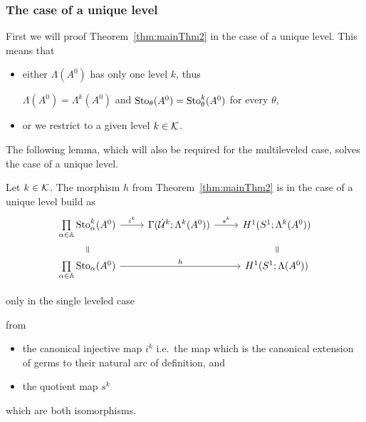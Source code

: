 \subsubsection{The case of a unique level}
First we will proof Theorem~\ref{thm:mainThm2} in the case of a unique level.
This means that
\begin{itemize}
  \item either $\Lambda(A^0)$ has only one level $k$, thus
    \begin{einr}
      $\Lambda(A^0)=\Lambda^k(A^0)$ and $\operatorname{Sto}_\theta(A^0)=\operatorname{Sto}_\theta^k(A^0)$
      for every $\theta$,
    \end{einr}
  \item or we restrict to a given level $k\in\mathcal{K}$.
\end{itemize}
The following lemma, which will also be required for the multileveled case,
solves the case of a unique level.
\begin{lem}\label{lem:solutionOfSingleLeveledCase}
  Let $k\in\mathcal{K}$.
  The morphism $h$ from Theorem~\ref{thm:mainThm2} is in the case of a unique
  level build as
  \[ \begin{tikzcd}[row sep=0cm]
    \underset{\alpha\in\A}\prod\Sto_\alpha^k(A^0)
    \rar{i^k}
    & \Gamma(\dot\cU^k;\Lambda^k(A^0))
    \rar{s^k}
    & H^1(S^1;\Lambda^k(A^0))
    \\
    \text{\rotatebox[origin=c]{-90}{$=$}}
    \tikzmark{e1}
    &&
    \tikzmark{e2}
    \text{\rotatebox[origin=c]{-90}{$=$}}
    \\
    \underset{\alpha\in\A}\prod\Sto_\alpha(A^0)
    \arrow{rr}{h}
    && H^1(S^1;\Lambda(A^0))
  \end{tikzcd} \]
  \begin{flushright}
     only in the single leveled case
  \end{flushright}
  from
  \begin{itemize}
  \item the canonical injective map $i^k$ i.e.\ the map which is the canonical
    extension of germs to their natural arc of definition, and
  \item the quotient map $s^k$
  \end{itemize}
  which are both isomorphisms.
\end{lem}
